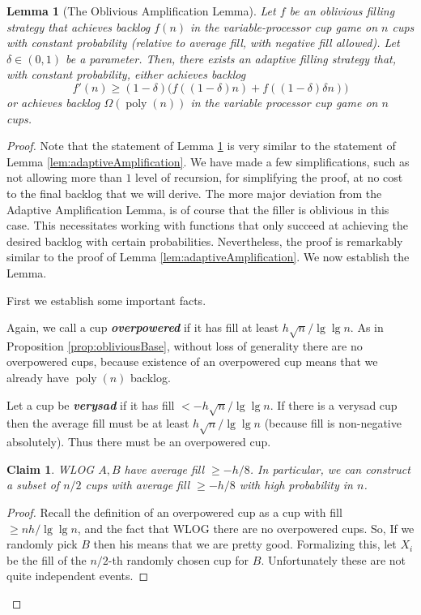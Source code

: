 \documentclass[twocolumn]{article}[10pt]
\newcommand{\defn}[1]{{\textit{\textbf{\boldmath #1}}}\xspace}
\DeclareMathOperator{\poly}{\text{poly}}
\newtheorem{clm}{Claim}
\newtheorem{lemma}{Lemma}
\begin{document}
\begin{lemma}[The Oblivious Amplification Lemma]
  \label{lem:obliviousAmplification}
  Let $f$ be an oblivious filling strategy that achieves backlog $f(n)$ in the
  variable-processor cup game on $n$ cups with constant probability (relative
  to average fill, with negative fill allowed). Let $\delta \in (0,1)$ be a
  parameter. Then, there exists an adaptive filling strategy that, with
  constant probability, either achieves backlog $$f'(n) \ge
  (1-\delta)\Big(f((1-\delta)n) + f((1-\delta)\delta n)\Big)$$ or achieves
  backlog $\Omega(\poly(n))$ in the variable processor cup game on $n$
  cups.
\end{lemma}
\begin{proof}
  {\color{cyan}
  Note that the statement of Lemma \ref{lem:obliviousAmplification} is very
  similar to the statement of Lemma \ref{lem:adaptiveAmplification}.
  We have made a few simplifications, such as not allowing more than $1$
  level of recursion, for simplifying the proof, at no cost to the final
  backlog that we will derive.
  The more major deviation from the Adaptive Amplification Lemma, is of course
  that the filler is oblivious in this case. This necessitates working with
  functions that only succeed at achieving the desired backlog with certain
  probabilities. 
  Nevertheless, the proof is remarkably similar to the proof of Lemma
  \ref{lem:adaptiveAmplification}. We now establish the Lemma.

  First we establish some important facts.

  Again, we call a cup \defn{overpowered} if it has fill at least $h\sqrt{n} /
  \lg\lg n$. As in Proposition \ref{prop:obliviousBase}, without loss of
  generality there are no overpowered cups, because existence of an overpowered
  cup means that we already have $\poly(n)$ backlog.

  Let a cup be \defn{verysad} if it has fill $< -h\sqrt{n}/\lg\lg n$.
  If there is a verysad cup then the average fill must be at least
  $h\sqrt{n}/\lg\lg n$ (because fill is non-negative absolutely). Thus there
  must be an overpowered cup.

\begin{clm}
  WLOG $A,B$ have average fill $\ge -h/8$.
  In particular, we can construct a subset of $n/2$
  cups with average fill $\ge -h/8$ with high probability in $n$. 
\end{clm}
\begin{proof}

  Recall the definition of an overpowered cup as a cup with fill $\ge nh / \lg \lg n$,
  and the fact that WLOG there are no overpowered cups.
  So, If we randomly pick $B$ then his means that we are pretty good. 
  Formalizing this, let $X_i$ be the fill of the $n/2$-th randomly chosen cup
  for $B$. Unfortunately these are not quite independent events.


\end{proof}}
\end{proof}
\end{document}
